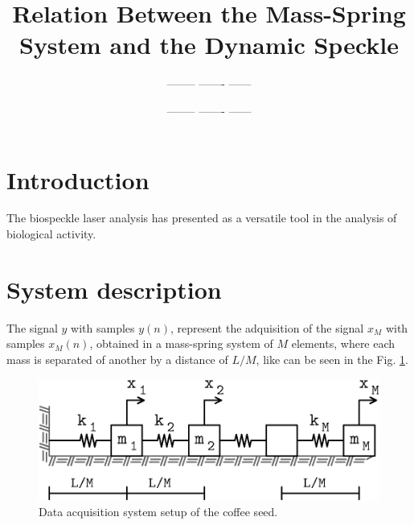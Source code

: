 \documentclass[11pt,twoside,a4paper]{article}
\begin{document}
 
\title{Relation Between the Mass-Spring System and the Dynamic Speckle}

\author{-------- ------- ------}
\author{-------- ------- ------}




\maketitle
\section{Introduction}
The biospeckle laser analysis has presented as a versatile tool in the analysis of
biological activity. 

\section{System description}
The signal $y$ with samples $y(n)$, 
represent the adquisition of the signal $x_M$ with samples $x_{M}(n)$, 
obtained  in a mass-spring system of $M$ elements, where each mass
is separated of another by a distance of $L/M$, like can be seen in the
Fig. \ref{fig:system}.
\begin{figure}[ht!]
\centering
\includegraphics[width=0.95\columnwidth]{images/system-mass-spring.eps}
\caption{Data acquisition system setup of the coffee seed.  }
\label{fig:system}
\end{figure}
\end{document}
